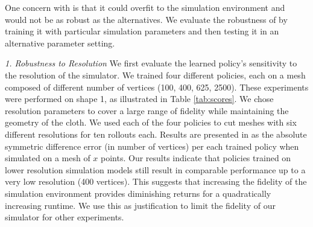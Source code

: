 One concern with \tpsalgo is that it could overfit to the simulation environment and would not be as robust as the alternatives.
We evaluate the robustness of \tpsalgo by training it with particular simulation parameters and then testing it in an alternative parameter setting.


\noindent \emph{1. Robustness to Resolution}\vspace{-0.1em}
\label{sec:fidelity}
We first evaluate the learned policy's sensitivity to the resolution of the simulator. 
We trained four different policies, each on a mesh composed of different number of vertices (100, 400, 625, 2500). These experiments were performed on shape 1, as illustrated in Table \ref{tab:scores}. We chose resolution parameters to cover a large range of fidelity while maintaining the geometry of the cloth. We used each of the four policies to cut meshes with six different resolutions for ten rollouts each.   Results are presented in   as the absolute symmetric difference error (in number of vertices) per each trained policy when simulated on a mesh of $x$ points. Our results indicate that policies trained on lower resolution simulation models still result in comparable  performance up to a very low resolution (400 vertices). This suggests that increasing the fidelity of the simulation environment provides diminishing returns for a quadratically increasing runtime. We use this as justification to limit the fidelity of our simulator for other experiments.

